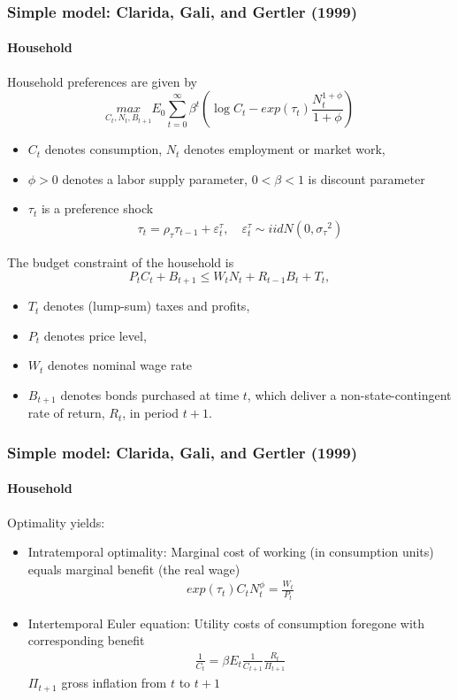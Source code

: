 \documentclass[handout]{beamer}  %
\begin{document}
\begin{frame}
  \frametitle{Simple model: Clarida, Gali, and Gertler (1999)}\framesubtitle{Household}\footnotesize
Household preferences are given by
\begin{equation*}
\underset{C_t,N_t,B_{t+1}}{max} E_{0}\sum_{t=0}^{\infty }\beta^t\left( \log C_{t}-exp(\tau_t)\frac{N_{t}^{1+\phi }}{1+\phi }\right)
\end{equation*}
\begin{itemize}
\item $C_{t}$ denotes consumption, $N_{t}$ denotes employment or market work,
\item $\phi>0$ denotes a labor supply parameter, $0<\beta<1$ is discount parameter
\item $\tau_t$ is a preference shock
\begin{align}
  \tau_t = \rho_\tau \tau_{t-1} + \varepsilon_t^\tau, \quad \varepsilon_t^\tau \sim iidN(0,{\sigma_\tau}^2)
\end{align}
\end{itemize}
The budget constraint of the household is
\begin{equation*}
  P_{t}C_{t}+B_{t+1}\leq W_{t}N_{t}+R_{t-1}B_{t}+T_{t},
\end{equation*}
\begin{itemize}
  \item $T_t$ denotes (lump-sum) taxes and profits,
  \item $P_t$ denotes price level,
  \item $W_t$ denotes nominal wage rate
  \item $B_{t+1}$ denotes bonds purchased at time $t$, which deliver a non-state-contingent rate of return, $R_{t}$, in period $t+1.$
\end{itemize}
\end{frame}

\begin{frame}\frametitle{Simple model: Clarida, Gali, and Gertler (1999)}\framesubtitle{Household}
Optimality yields:
\begin{itemize}
  \item Intratemporal optimality: Marginal cost of working (in consumption units) equals marginal benefit (the real wage)
  \begin{align*}
    exp(\tau_t)C_t N_t^\phi = \frac{W_t}{P_t}
  \end{align*}
  \item Intertemporal Euler equation: Utility costs of consumption foregone with corresponding benefit
  \begin{align}
    \frac{1}{C_t} = \beta E_t \frac{1}{C_{t+1}} \frac{R_t}{\Pi_{t+1}}
  \end{align}
  $\Pi_{t+1}$ gross inflation from $t$ to $t+1$
\end{itemize}

\end{frame}
\end{document}
